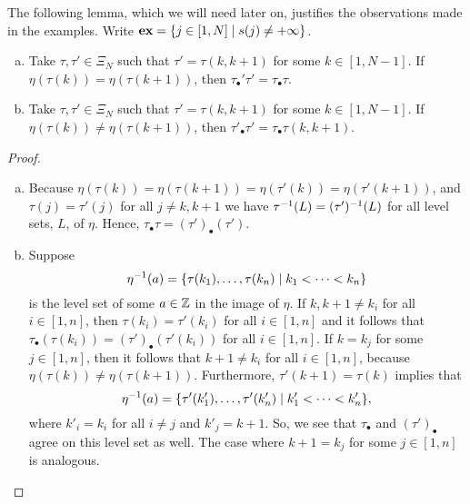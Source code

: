 The following lemma, which we will need later on, justifies the observations made in
the examples. Write $\mathbf{ex} = \{j \in [1, N] \mid s(j) \neq + \infty\}$.

\begin{lemma}\label{lem:tau_bullet}
	\leavevmode
	\begin{enumerate}[(a)]
		\item Take $\tau,\tau' \in \Xi_N$ such that $\tau' = \tau(k, k +1)$ for some $k \in [1,
				      N-1]$. If $\eta(\tau(k)) = \eta(\tau(k+1))$, then $\tau_\bullet'\tau' =
			      \tau_\bullet\tau$.
		\item Take $\tau,\tau' \in \Xi_N$ such that $\tau' = \tau(k, k +1)$ for some $k \in [1,
				      N-1]$. If $\eta(\tau(k)) \neq \eta(\tau(k+1))$, then $\tau'_\bullet\tau' =
			      \tau_\bullet\tau (k, k +1)$.
	\end{enumerate}
\end{lemma}
\begin{proof}\leavevmode
	\begin{enumerate}[(a)]
		\item Because $\eta(\tau(k)) = \eta(\tau(k+1)) = \eta(\tau'(k)) = \eta(\tau'(k+1))$, and
		      $\tau(j) = \tau'(j)$ for all $j\neq k, k+1$ we have $\tau^{-1}(L) = (\tau')^{-1}(L)$ for
		      all level sets, $L$, of $\eta$. Hence, $\tau_\bullet\tau = (\tau')_\bullet(\tau')$.
		\item Suppose
		      \begin{equation*}
			      \eta^{-1}(a) = \{\tau(k_1), \dots, \tau(k_n) \mid k_1 < \dots < k_n\}
		      \end{equation*}
		      is the level set of some $a\in \mathbb{Z}$ in the image of $\eta$. If $k, k+1 \neq k_i$ for
		      all $i \in [1, n]$, then $\tau(k_i) = \tau'(k_i)$ for all $i\in [1, n]$ and it follows
		      that $\tau_\bullet (\tau(k_i)) = (\tau')_\bullet (\tau'(k_i))$ for all $i\in [1, n]$.
		      If $k = k_j$ for some $j \in [1, n]$, then it follows that $k+1 \neq k_i$ for all $i\in
			      [1, n]$, because $\eta(\tau(k)) \neq \eta(\tau(k+1))$. Furthermore, $\tau'(k+1) =
			      \tau(k)$ implies that
		      \begin{equation*}
			      \eta^{-1}(a) = \{\tau'(k'_1), \dots, \tau'(k'_n)
			      \mid k'_1 < \cdots < k'_n\}	,
		      \end{equation*}
		      where $k'_i = k_i$ for all $i \neq j$ and $k'_j = k+1$. So, we see that $\tau_\bullet$
		      and $(\tau')_\bullet$ agree on this level set as well. The case where $k+1 = k_j$ for
		      some $j\in [1, n]$ is analogous.
	\end{enumerate}
\end{proof}

